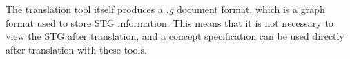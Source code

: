 \documentclass[british,conference,compsoc]{IEEEtran}
\newcommand{\noun}[1]{\textsc{#1}}
\begin{document}
The translation tool itself produces a \emph{.g} document format, which is a
graph format used to store STG information. This means that it is not
necessary to view the STG after translation, and a concept specification
can be used directly after translation with these tools. 



\end{document}
